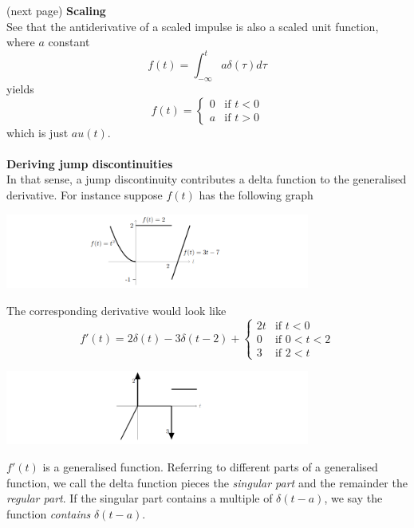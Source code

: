 \documentclass{report}
\begin{document}
(next page)\newpage
\noindent\textbf{Scaling}\\
See that the antiderivative of a scaled impulse is also a scaled unit function, where $a$ constant
\begin{equation*}
f(t)=\int^t_{-\infty}a\delta(\tau)d\tau
\end{equation*}
yields
\begin{equation*}
f(t)=\begin{cases}
0&\text{if }t<0\\
a&\text{if }t>0
\end{cases}
\end{equation*}
which is just $au(t)$.\\
\vspace{1mm}\\
\textbf{Deriving jump discontinuities}\\
In that sense, a jump discontinuity contributes a delta function to the generalised derivative. For instance
suppose $f(t)$ has the following graph
\begin{center}
\includegraphics[width=10cm]{49}\\
\end{center}
The corresponding derivative would look like
\begin{equation*}
f'(t)=2\delta(t)-3\delta(t-2)+\begin{cases}
2t&\text{if }t<0\\
0&\text{if }0<t<2\\
3&\text{if }2<t
\end{cases}
\end{equation*}
\begin{center}
\includegraphics[width=10cm]{50}\\
\end{center}
$f'(t)$ is a generalised function. Referring to different parts of a generalised function, we call the delta
function pieces the \textit{singular part} and the remainder the \textit{regular part}.
If the singular part contains a multiple of $\delta(t-a)$, we say the function \textit{contains} $\delta(t-a)$.
\newpage
\end{document}
